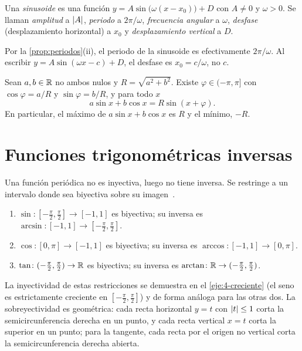 \addtocounter{figure}{1}%

\begin{definicion}[Sinusoide]
Una \emph{sinusoide} es una función $y=A\sin\bigl(\omega(x-x_0)\bigr)+D$ con $A\ne0$ y $\omega>0$. Se llaman \emph{amplitud} a $\lvert A\rvert$, \emph{periodo} a $2\pi/\omega$, \emph{frecuencia angular} a $\omega$, \emph{desfase} (desplazamiento horizontal) a $x_0$ y \emph{desplazamiento vertical} a $D$.
\end{definicion}

Por la \cref{prop:periodos}(ii), el periodo de la sinusoide es efectivamente $2\pi/\omega$. Al escribir $y=A\sin(\omega x-c)+D$, el desfase es $x_0=c/\omega$, no $c$.

\begin{proposicion}\label{prop:armonico}
Sean $a,b\in\mathbb{R}$ no ambos nulos y $R=\sqrt{a^{2}+b^{2}}$. Existe $\varphi\in(-\pi,\pi]$ con $\cos\varphi=a/R$ y $\sin\varphi=b/R$, y para todo $x$
\[
a\sin x+b\cos x=R\sin(x+\varphi).
\]
En particular, el máximo de $a\sin x+b\cos x$ es $R$ y el mínimo, $-R$.
\end{proposicion}

\section{Funciones trigonométricas inversas}

Una función periódica no es inyectiva, luego no tiene inversa. Se restringe a un intervalo donde sea biyectiva sobre su imagen~\cite[§8.3]{osat}.

\begin{definicion}\label{def:inversas}
\begin{enumerate}
  \item $\sin\colon[-\frac{\pi}{2},\frac{\pi}{2}]\to[-1,1]$ es biyectiva; su inversa es $\arcsin\colon[-1,1]\to[-\frac{\pi}{2},\frac{\pi}{2}]$.
  \item $\cos\colon[0,\pi]\to[-1,1]$ es biyectiva; su inversa es $\arccos\colon[-1,1]\to[0,\pi]$.
  \item $\tan\colon(-\frac{\pi}{2},\frac{\pi}{2})\to\mathbb{R}$ es biyectiva; su inversa es $\arctan\colon\mathbb{R}\to(-\frac{\pi}{2},\frac{\pi}{2})$.
\end{enumerate}
\end{definicion}

La inyectividad de estas restricciones se demuestra en el \cref{eje:4-creciente} (el seno es estrictamente creciente en $[-\frac{\pi}{2},\frac{\pi}{2}]$) y de forma análoga para las otras dos. La sobreyectividad es geométrica: cada recta horizontal $y=t$ con $\lvert t\rvert\le1$ corta la semicircunferencia derecha en un punto, y cada recta vertical $x=t$ corta la superior en un punto; para la tangente, cada recta por el origen no vertical corta la semicircunferencia derecha abierta.

